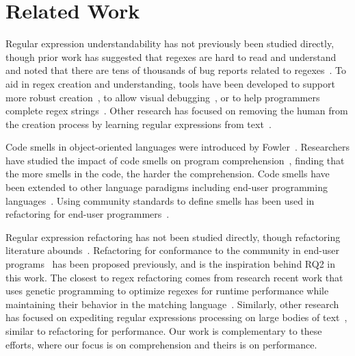 \section{Related Work}
\label{sec:related}
Regular expression understandability has not previously been studied directly, though prior work has suggested that regexes are hard to read and understand~\cite{chapman2016} and noted that there are tens of thousands of bug reports related to regexes~\cite{Spishak:2012:TSR:2318202.2318207}. 
To aid in regex creation and understanding, tools have been developed to support more robust creation~\cite{Spishak:2012:TSR:2318202.2318207}, to allow visual debugging~\cite{Beck:2014:RVD:2591062.2591111}, or to help programmers complete regex strings~\cite{Omar:2012:ACC:2337223.2337324}. Other research has focused on removing the human from the creation process by learning regular expressions from text~\cite{Babbar:2010:CBA:1871840.1871848, Li:2008:REL:1613715.1613719}.

Code smells in object-oriented languages were introduced by Fowler~\cite{Fowl1999}. Researchers have studied the impact of code smells on program comprehension~\cite{abbes2011empirical, du2006does}, finding that the more smells in the code, the harder the comprehension. 
Code smells have been extended to other language paradigms including end-user programming languages~\cite{Hermans2012intra, Hermans2012intraExt, stoleeicse, stoleeTSE}. 
Using community standards to define smells has been used in refactoring for end-user programmers~\cite{stoleeicse, stoleeTSE}. 

Regular expression refactoring has not been studied directly, though refactoring literature abounds~\cite{Mens:2004:SSR:972215.972286, opdyke1992refactoring, Griswold:1993:AAP:152388.152389}. 
Refactoring for conformance to the community in end-user programs~\cite{stoleeicse, stoleeTSE} has been proposed previously, and is the inspiration behind RQ2 in this work.
The closest to regex refactoring comes from research recent work that uses genetic programming to optimize regexes for runtime performance while maintaining their behavior in the matching language~\cite{cody2017search}. 
Similarly, other research has focused on expediting regular expressions processing on large bodies of text~\cite{Baeza-Yates:1996:FTS:235809.235810}, similar to refactoring for performance. 
Our work is complementary to these efforts, where our focus is on comprehension and theirs is on performance. 

